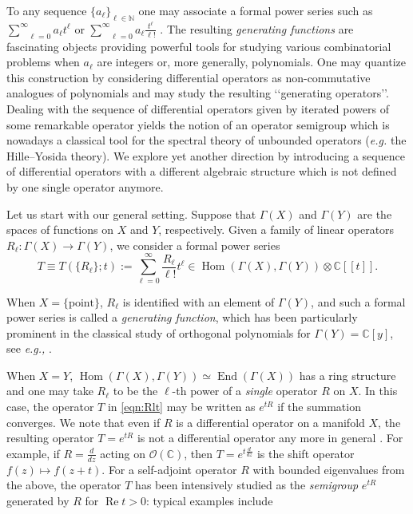 \documentclass[12pt,leqno]{amsart}
\theoremstyle{plain}
\theoremstyle{definition}
\begin{document}
To any sequence  $\{a_\ell\}_{\ell\in\mathbb N}$ one may associate a
formal power series such as $\underset{\ell=0}{\overset{\infty}{\sum}}
a_\ell {t^\ell}$ or $\underset{\ell=0}{\overset{\infty}{\sum}}
a_\ell\frac{t^\ell}{\ell!}$ .  The resulting \emph{generating functions} are fascinating objects providing powerful tools
for studying various combinatorial problems when $a_\ell$ are integers or, more generally,
 polynomials. 
One may
quantize this construction by considering differential operators as
non-commutative analogues of polynomials
 and may study the resulting 
 \lq\lq{generating operators}\rq\rq. 
Dealing with the sequence of differential
operators given by iterated powers of some remarkable operator yields
the notion of an operator semigroup which is nowadays a classical tool
for the spectral theory of unbounded operators 
({\it{e.g.}} the Hille--Yosida theory). 
We explore yet another direction by
introducing a sequence of differential operators
 with a different
algebraic structure
 which is not defined by one single operator anymore.



Let us start with our general setting.  
Suppose that $\Gamma(X)$ and $\Gamma(Y)$ are the spaces
 of functions 
 on $X$ and $Y$, 
 respectively.  
Given a family of linear operators
 $R_{\ell}\colon \Gamma(X) \to \Gamma(Y)$, 
 we consider a formal power series
\begin{equation}
\label{eqn:Rlt}
T\equiv T(\{R_{\ell}\}; t):=\sum_{\ell=0}^{\infty}\frac{R_{\ell}}{\ell!}t^{\ell} \in \operatorname{Hom}(\Gamma(X), \Gamma(Y)) \otimes {\mathbb{C}}[[t]]. 
\end{equation}



When $X=\{\text{point}\}$, 
 $R_{\ell}$ is identified with an element of $\Gamma(Y)$, 
 and such a formal power series is called a {\it{generating function}}, 
 which has been particularly prominent
 in the classical study of orthogonal polynomials
 for $\Gamma(Y)={\mathbb{C}}[y]$, 
 see {\it{e.g.,}} \cite{xSrMa84, xSz75}.  



When $X=Y$, 
 $\operatorname{Hom}(\Gamma(X), \Gamma(Y))\simeq {\operatorname{End}}(\Gamma(X))$
 has a ring structure
 and one may take $R_{\ell}$
 to be the $\ell$-th power of a {\it{single}} operator $R$
 on $X$.  
In this case, 
 the operator $T$ in \eqref{eqn:Rlt}
 may be written as $e^{t R}$
 if the summation converges.  
We note that even if $R$ is a differential operator 
 on a manifold $X$, 
 the resulting operator $T=e^{t R}$ is not a differential operator
 any more in general .  
For example, 
 if $R=\frac {d}{d z}$ acting on ${\mathcal{O}}({\mathbb{C}})$, 
 then $T=e^{t \frac d {dz}}$ is the shift operator
 $f(z) \mapsto f(z+t)$.  
For a self-adjoint operator $R$
 with bounded eigenvalues from the above, 
 the operator $T$ has been intensively studied
 as the {\it{semigroup}} $e^{t R}$
 generated by $R$ for $\operatorname{Re} t>0$:
 typical examples include 
\end{document}
